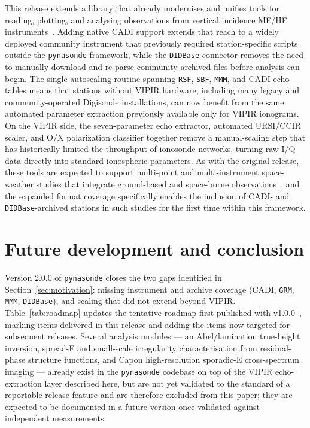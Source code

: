 \documentclass[12pt,a4paper]{article}
\begin{document}
This release extends a library that already modernises and unifies tools for
reading, plotting, and analysing observations from vertical incidence MF/HF
instruments~\cite{Chakraborty2026}. Adding native CADI support extends that
reach to a widely deployed community instrument that previously required
station-specific scripts outside the \texttt{pynasonde} framework, while the
\texttt{DIDBase} connector removes the need to manually download and
re-parse community-archived files before analysis can begin. The single
autoscaling routine spanning \texttt{RSF}, \texttt{SBF}, \texttt{MMM}, and
CADI echo tables means that stations without VIPIR hardware, including many
legacy and community-operated Digisonde installations, can now benefit from
the same automated parameter extraction previously available only for VIPIR
ionograms. On the VIPIR side, the seven-parameter echo extractor, automated
URSI/CCIR scaler, and O/X polarization classifier together remove a
manual-scaling step that has historically limited the throughput of
ionosonde networks, turning raw I/Q data directly into standard ionospheric
parameters. As with the original release, these tools are expected to
support multi-point and multi-instrument space-weather studies that
integrate ground-based and space-borne observations~\cite{Chakraborty2026},
and the expanded format coverage specifically enables the inclusion of CADI-
and \texttt{DIDBase}-archived stations in such studies for the first time
within this framework.

\section{Future development and conclusion}
\label{sec:conclusions}

Version 2.0.0 of \texttt{pynasonde} closes the two gaps identified in
Section~\ref{sec:motivation}: missing instrument and archive coverage
(CADI, \texttt{GRM}, \texttt{MMM}, \texttt{DIDBase}), and scaling that did
not extend beyond VIPIR. Table~\ref{tab:roadmap} updates the tentative
roadmap first published with v1.0.0~\cite{Chakraborty2026}, marking items
delivered in this release and adding the items now targeted for subsequent
releases. Several analysis modules --- an Abel/lamination true-height
inversion, spread-F and small-scale irregularity characterisation from
residual-phase structure functions, and Capon high-resolution sporadic-E
cross-spectrum imaging --- already exist in the \texttt{pynasonde} codebase
on top of the VIPIR echo-extraction layer described here, but are not yet
validated to the standard of a reportable release feature and are therefore
excluded from this paper; they are expected to be documented in a future
version once validated against independent measurements.
\end{document}
